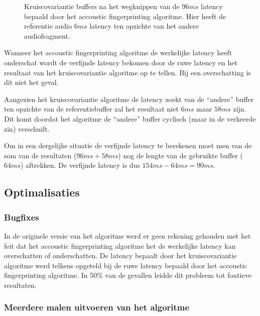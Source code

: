 \begin{figure}[h!]
	\captionsetup{width=0.7\textwidth}
	\caption[Kruiscovariantie buffers]{Kruiscovariantie buffers na het wegknippen van de $ 96 ms $ latency bepaald door het accoustic fingerprinting algoritme. Hier heeft de referentie audio $ 6 ms $ latency ten opzichte van het andere audiofragment.   }
	\begin{center}
		\advance\parskip0.3cm
		
	\end{center}
	\label{crosscovariance2}
\end{figure}

Wanneer het accoustic fingerprinting algoritme de werkelijke latency heeft onderschat wordt de verfijnde latency bekomen door de ruwe latency en het resultaat van het kruiscovariantie algoritme op te tellen. Bij een overschatting is dit niet het geval.

Aangezien het kruiscovariantie algoritme de latency zoekt van de ``andere'' buffer ten opzichte van de referentiebuffer zal het resultaat niet $6 ms$ maar $ 58 ms $ zijn. Dit komt doordat het algoritme de ``andere'' buffer cyclisch (maar in de verkeerde zin) verschuift.

Om in een dergelijke situatie de verfijnde latency te berekenen moet men van de som van de resultaten ($96 ms + 58 ms$) nog de lengte van de gebruikte buffer ($ 64ms $) aftrekken. De verfijnde latency is dus $ 154 ms - 64 ms = 90 ms $.


\subsection{Optimalisaties}

\subsubsection{Bugfixes}

In de originele versie van het algoritme werd er geen rekening gehouden met het feit dat het accoustic fingerprinting algoritme het de werkelijke latency kan overschatten of onderschatten. De latency bepaalt door het kruiscovariantie algoritme werd telkens opgeteld bij de ruwe latency bepaald door het accoustic fingerprinting algoritme. In 50\% van de gevallen leidde dit probleem tot foutieve resultaten.

\subsubsection{Meerdere malen uitvoeren van het algoritme}
\label{crosscovariance-repeated}

